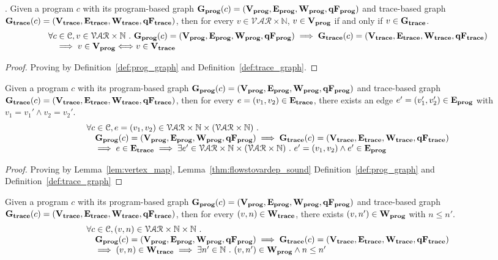 	\begin{lem}.
	\label{lem:vertex_map}
	Given a program $c$ with its
	program-based graph $\mathtt{\bf{G_{prog}}}({c}) = (\mathtt{\bf{V_{prog}}}, \mathtt{\bf{E_{prog}}}, \mathtt{\bf{W_{prog}}}, \mathtt{\bf{qF_{prog}}})$
	and 
	trace-based graph $\mathtt{\bf{G_{trace}}}({c}) = (\mathtt{\bf{V_{trace}}}, \mathtt{\bf{E_{trace}}}, \mathtt{\bf{W_{trace}}}, \mathtt{\bf{qF_{trace}}})$,
	then for every $v \in \mathcal{VAR} \times \mathbb{N}$,
	$v \in \mathtt{\bf{V_{prog}}}$ if and only if $v \in \mathtt{\bf{G_{trace}}}$.
	\[
	\begin{array}{l}
	\forall c \in \mathcal{C} , v \in \mathcal{VAR} \times \mathbb{N} ~.~ 
	\mathtt{\bf{G_{prog}}}({c}) = (\mathtt{\bf{V_{prog}}}, \mathtt{\bf{E_{prog}}}, \mathtt{\bf{W_{prog}}}, \mathtt{\bf{qF_{prog}}})
	\implies 
	\mathtt{\bf{G_{trace}}}({c}) = (\mathtt{\bf{V_{trace}}}, \mathtt{\bf{E_{trace}}}, \mathtt{\bf{W_{trace}}}, \mathtt{\bf{qF_{trace}}})
	\\ \quad
	\implies
	v \in \mathtt{\bf{V_{prog}}} \Longleftrightarrow v \in \mathtt{\bf{V_{trace}}}
	\end{array}
	\]
	\end{lem}
\begin{proof}
Proving by Definition~\ref{def:prog_graph} and Definition~\ref{def:trace_graph}.
\end{proof}
%
	\begin{lem}
	\label{lem:edge_map}
	Given a program $c$ with its
	program-based graph $\mathtt{\bf{G_{prog}}}({c}) = (\mathtt{\bf{V_{prog}}}, \mathtt{\bf{E_{prog}}}, \mathtt{\bf{W_{prog}}}, \mathtt{\bf{qF_{prog}}})$
	and 
	trace-based graph $\mathtt{\bf{G_{trace}}}({c}) = (\mathtt{\bf{V_{trace}}}, \mathtt{\bf{E_{trace}}}, \mathtt{\bf{W_{trace}}}, \mathtt{\bf{qF_{trace}}})$,
	then for every $e = (v_1, v_2) \in \mathtt{\bf{E_{trace}}}$, there exists an edge 
	$e' = (v_1', v_2') \in \mathtt{\bf{E_{prog}}}$ with 
	$v_1 = v_1' \land v_2 = v_2'$.
	\[
	\begin{array}{l}
	\forall c \in \mathcal{C} , e = (v_1, v_2) \in \mathcal{VAR} \times \mathbb{N} \times (\mathcal{VAR} \times \mathbb{N})
	 ~.~ 
	 \\ \quad
	 \mathtt{\bf{G_{prog}}}({c}) = (\mathtt{\bf{V_{prog}}}, \mathtt{\bf{E_{prog}}}, \mathtt{\bf{W_{prog}}}, \mathtt{\bf{qF_{prog}}})
	\implies 
	\mathtt{\bf{G_{trace}}}({c}) = (\mathtt{\bf{V_{trace}}}, \mathtt{\bf{E_{trace}}}, \mathtt{\bf{W_{trace}}}, \mathtt{\bf{qF_{trace}}})
	\\ \quad
	\implies
	e \in \mathtt{\bf{E_{trace}}}
	\implies 
	\exists e' \in \mathcal{VAR} \times \mathbb{N} \times (\mathcal{VAR} \times \mathbb{N})~.~ 
	e' = (v_1, v_2) \land e' \in \mathtt{\bf{E_{prog}}}
	\end{array}
	\]
	\end{lem}
\begin{proof}
Proving by Lemma~\ref{lem:vertex_map}, Lemma~\ref{thm:flowstovardep_sound} Definition~\ref{def:prog_graph} and Definition~\ref{def:trace_graph}
\end{proof}
%
\begin{lem}
	\label{lem:weights_map}
	Given a program $c$ with its
	program-based graph $\mathtt{\bf{G_{prog}}}({c}) = (\mathtt{\bf{V_{prog}}}, \mathtt{\bf{E_{prog}}}, \mathtt{\bf{W_{prog}}}, \mathtt{\bf{qF_{prog}}})$
	and 
	trace-based graph $\mathtt{\bf{G_{trace}}}({c}) = (\mathtt{\bf{V_{trace}}}, \mathtt{\bf{E_{trace}}}, \mathtt{\bf{W_{trace}}}, \mathtt{\bf{qF_{trace}}})$,
	then for every $(v, n) \in \mathtt{\bf{W_{trace}}}$, 
	there exists $(v, n') \in \mathtt{\bf{W_{prog}}}$ with $n \leq n'$.
	\[
	\begin{array}{l}
	\forall c \in \mathcal{C} , (v, n) \in \mathcal{VAR} \times \mathbb{N} \times \mathbb{N}
	 ~.~ 
	 \\ \quad
	 \mathtt{\bf{G_{prog}}}({c}) = (\mathtt{\bf{V_{prog}}}, \mathtt{\bf{E_{prog}}}, \mathtt{\bf{W_{prog}}}, \mathtt{\bf{qF_{prog}}})
	\implies 
	\mathtt{\bf{G_{trace}}}({c}) = (\mathtt{\bf{V_{trace}}}, \mathtt{\bf{E_{trace}}}, \mathtt{\bf{W_{trace}}}, \mathtt{\bf{qF_{trace}}})
	\\ \quad
	\implies
	(v, n) \in \mathtt{\bf{W_{trace}}}
	\implies 
	\exists n' \in \mathbb{N}~.~ 
	(v, n') \in \mathtt{\bf{W_{prog}}}  \land n \leq n'
	\end{array}
	\]
	\end{lem}
